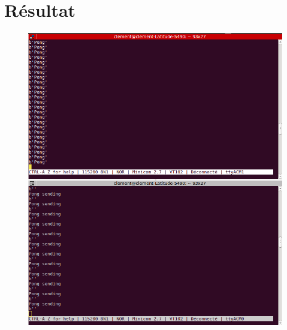 \documentclass{article}
\begin{document}
\section{Résultat}
\begin{figure}[H]
\begin{center}
\advance\leftskip-3cm
\advance\rightskip-3cm
\includegraphics[keepaspectratio=true,scale=0.4]{pin_pongminicom.png}
\label{visina8}
\end{center}\end{figure}
\end{document}
